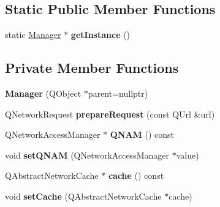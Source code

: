\subsection*{Static Public Member Functions}
\begin{DoxyCompactItemize}
\item 
\mbox{\label{classNetwork_1_1Manager_adeda284a39ae4c942656ec87295cf024}} 
static \mbox{\hyperlink{classNetwork_1_1Manager}{Manager}} $\ast$ {\bfseries get\+Instance} ()
\end{DoxyCompactItemize}
\subsection*{Private Member Functions}
\begin{DoxyCompactItemize}
\item 
\mbox{\label{classNetwork_1_1Manager_ad3499eea3fd823034264277f9e0cf6a9}} 
{\bfseries Manager} (Q\+Object $\ast$parent=nullptr)
\item 
\mbox{\label{classNetwork_1_1Manager_aa9c1081a6e3ec9b937c3bbb9a7f7202f}} 
Q\+Network\+Request {\bfseries prepare\+Request} (const Q\+Url \&url)
\item 
\mbox{\label{classNetwork_1_1Manager_a105b541b83fa32472b40730a885154ef}} 
Q\+Network\+Access\+Manager $\ast$ {\bfseries Q\+N\+AM} () const
\item 
\mbox{\label{classNetwork_1_1Manager_aaf5a945f52e51e357b53cacdc7319ab2}} 
void {\bfseries set\+Q\+N\+AM} (Q\+Network\+Access\+Manager $\ast$value)
\item 
\mbox{\label{classNetwork_1_1Manager_a4aea14959afca0afd4b91208033da401}} 
Q\+Abstract\+Network\+Cache $\ast$ {\bfseries cache} () const
\item 
\mbox{\label{classNetwork_1_1Manager_ab73570326de530e3cdd09f6bf3f195d0}} 
void {\bfseries set\+Cache} (Q\+Abstract\+Network\+Cache $\ast$cache)
\end{DoxyCompactItemize}
